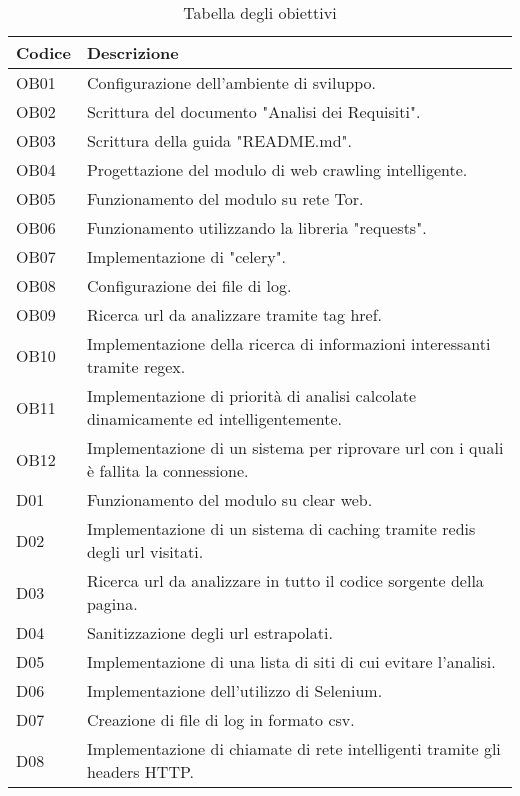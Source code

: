 \begin{longtable}{|p{}|p{}|}
	\caption{Tabella degli obiettivi}
	\label{tab:tabella-obiettivi} \\
	\hline
	\textbf{Codice}	&	\textbf{Descrizione} \\
    \hline
    OB01		&	Configurazione dell'ambiente di sviluppo. \\  
	\hline
    OB02		&	Scrittura del documento "Analisi dei Requisiti". \\ 
	\hline
    OB03		&	Scrittura della guida "README.md". \\
    \hline
    OB04		&	Progettazione del modulo di web crawling intelligente. \\
    \hline
    OB05		&	Funzionamento del modulo su rete Tor. \\
    \hline
    OB06		&	Funzionamento utilizzando la libreria "requests". \\
    \hline
    OB07		&	Implementazione di "celery". \\
    \hline
    OB08		&	Configurazione dei file di log. \\
    \hline
    OB09		&	Ricerca url da analizzare tramite tag href. \\
    \hline
    OB10		&	Implementazione della ricerca di informazioni interessanti tramite regex. \\
    \hline
    OB11		&	Implementazione di priorità di analisi calcolate dinamicamente ed intelligentemente. \\
    \hline
    OB12		&	Implementazione di un sistema per riprovare url con i quali è fallita la connessione. \\
    \hline
    D01			&	Funzionamento del modulo su clear web. \\
    \hline
    D02			&	Implementazione di un sistema di caching tramite redis degli url visitati. \\
    \hline
    D03			&	Ricerca url da analizzare in tutto il codice sorgente della pagina. \\
    \hline
    D04			&	Sanitizzazione degli url estrapolati. \\
    \hline
    D05			&	Implementazione di una lista di siti di cui evitare l'analisi. \\
    \hline 
    D06			&	Implementazione dell'utilizzo di Selenium. \\
    \hline
    D07			&	Creazione di file di log in formato csv. \\
    \hline
    D08			&	Implementazione di chiamate di rete intelligenti tramite gli headers HTTP. \\

\end{longtable}
